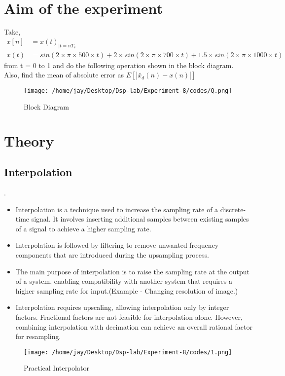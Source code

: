 \documentclass[journal,12pt,onecolumn]{IEEEtran}
\theoremstyle{remark}
\begin{document}
\section{Aim of the experiment}
Take,
\begin{align}
x[n] &= x(t)_{|t = nT_s} \\
x(t) &= sin(2\times\pi\times 500 \times t) + 2\times sin(2\times\pi\times 700 \times t) + 1.5\times sin(2\times\pi\times 1000 \times t)
\end{align}
from t = 0 to 1 and do the following operation shown in the block diagram.\\
Also, find the mean of absolute error as $E[|\widetilde{x_d}(n) - x(n)|]$ 
\begin{figure}[ht] %
  \centering
  \texttt{[image: /home/jay/Desktop/Dsp-lab/Experiment-8/codes/Q.png]}
  \caption{Block Diagram}
\end{figure}
\section{Theory}
\subsection{Interpolation}.
 \begin{itemize}[label=$\bullet$]
	\item Interpolation is a technique used to increase the sampling rate of a discrete-time signal. It involves inserting additional samples between existing samples of a signal to achieve a higher sampling rate.
	\item Interpolation is followed by filtering to remove unwanted frequency components that are introduced during the upsampling process.    
	\item The main purpose of interpolation is to raise the sampling rate at the output of a system, enabling compatibility with another system that requires a higher sampling rate for input.(Example - Changing resolution of image.) 
	\item Interpolation requires upscaling, allowing interpolation only by integer factors. Fractional factors are not feasible for interpolation alone. However, combining interpolation with decimation can achieve an overall rational factor for resampling.
  \end{itemize}
\begin{figure}[ht] %
  \centering
  \texttt{[image: /home/jay/Desktop/Dsp-lab/Experiment-8/codes/1.png]}
  \caption{Practical Interpolator}
\end{figure}
\end{document}
